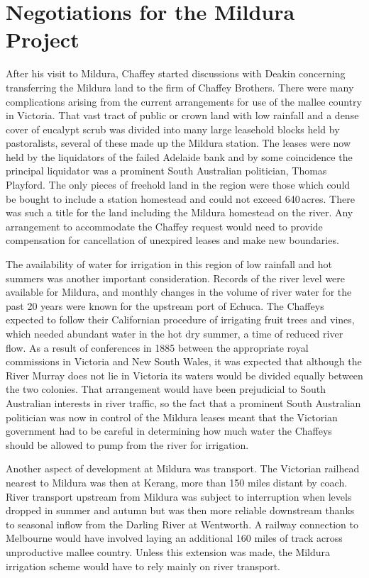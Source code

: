 \section*{Negotiations for the Mildura Project}

After his visit to Mildura, Chaffey started discussions with Dea\-kin
concerning transferring the Mildura land to the firm of Chaffey
Brothers.  There were many complications arising from the current
arrangements for use of the mallee  country in
Victoria.  That vast tract of public or crown land with low rainfall
and a dense cover of eucalypt scrub was divided into many large
leasehold blocks held by pastoralists, several of these made up the
Mildura station.  The leases were now held by
the liquidators of the failed Adelaide bank and by some coincidence
the principal liquidator was a prominent South Australian politician,
Thomas Playford.   The only pieces of freehold
land in the region were those which could be bought to include a
station homestead and could not exceed 640\,acres.  There was such a
title for the land including the Mildura homestead on the river.  Any
arrangement to accommodate the Chaffey request would need to provide
compensation for cancellation of unexpired leases and make new
boundaries.

The availability of water for irrigation in this region of low
rainfall and hot summers was another important consideration.  Records
of the river level were available for Mildura, 
and monthly changes in the volume of river water for the past 20 years
were known for the upstream port of Echuca.   The
Chaffeys expected to follow their Californian
procedure of irrigating fruit trees and
vines, which needed abundant water in the hot dry
summer, a time of reduced river flow.  As a result of conferences in
1885 between the appropriate royal commissions in Victoria and New
South Wales, it was expected that although the River Murray does not
lie in Victoria its waters would be divided equally between the two
colonies.  That arrangement would have been prejudicial to South
Australian interests in river traffic, so the fact that a prominent
South Australian politician was now in control of the Mildura leases
meant that the Victorian government had to be careful in determining
how much water the Chaffeys should be allowed to pump from the river
for irrigation.

Another aspect of development at Mildura was transport.  The Victorian
railhead nearest to Mildura was then at Kerang,
  more than 150 miles distant by coach.  River
transport upstream from Mildura was subject to interruption when
levels dropped in summer and autumn but was then more reliable
downstream thanks to seasonal inflow from the Darling River at
Wentworth.  A railway connection to Melbourne would have involved
laying an additional 160 miles of track across unproductive mallee
country.  Unless this extension was made, the Mildura irrigation
scheme would have to rely mainly on river transport.

